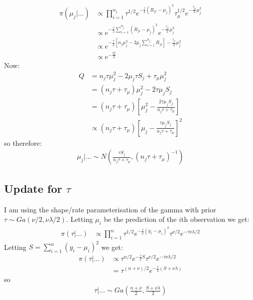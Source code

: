 \documentclass{article}
\begin{document}
\begin{align*}
\pi(\mu_{j}|\ldots)  &\propto \prod_{i=1}^{n_j}  \tau^{1/2} e^{-\frac{\tau}{2} (R_{ji} - \mu_{j})^2} \tau_{\mu}^{1/2} e^{-\frac{\tau_\mu}{2} \mu_{j}^2 }\\
&\propto e^{-\frac{\tau}{2} \sum_{i=1}^{n_j} (R_{ji} - \mu_{j})^2} e^{-\frac{\tau_\mu}{2} \mu_{j}^2 } \\ 
&\propto e^{-\frac{\tau}{2} \left[ n_j \mu_{j}^2 - 2 \mu_j  \sum_{i=1}^{n_j} R_{ji} \right] - \frac{\tau_\mu}{2} \mu_j^2}\\
&\propto e^{-\frac{Q}{2}}
\end{align*}
Now:
\begin{align*}
Q &= n_j \tau \mu_j^2 - 2\mu_j \tau S_j + \tau_\mu \mu_j^2\\
&= (n_j \tau + \tau_\mu) \mu_j^2 - 2 \tau \mu_j S_j \\
&= (n_j \tau + \tau_\mu) \left[ \mu_j^2 - \frac{2 \tau \mu_j S_j}{n_j \tau + \tau_\mu} \right] \\
&\propto (n_j \tau + \tau_\mu) \left[ \mu_j - \frac{\tau \mu_j S_j}{n_j \tau + \tau_\mu} \right]^2
\end{align*}
so therefore:
\begin{align}
\mu_j| \ldots \sim N \left( \frac{\tau S_j}{n_j \tau + \tau_\mu} , (n_j \tau + \tau_\mu)^{-1} \right)
\end{align}

\subsection*{Update for $\tau$}

I am using the shape/rate parameterisation of the gamma with prior $\tau \sim Ga(\nu/2, \nu \lambda / 2)$. Letting $\mu_i$ be the prediction of the $i$th observation we get:
\begin{align*}
\pi(\tau | \ldots) &\propto \prod_{i=1}^n \tau^{1/2} e^{-\frac{\tau}{2} (y_i - \mu_i)^2} \tau^{\nu/2} e^{-\tau \nu \lambda / 2}
\end{align*}
Letting $S = \sum_{i=1}^n (y_i - \mu_i)^2$ we get:
\begin{align*}
\pi(\tau | \ldots) &\propto \tau^{n/2} e^{-\frac{\tau}{2} S} \tau^{\nu/2} e^{-\tau \nu \lambda / 2}\\
&= \tau^{(n + \nu)/2} e^{-\frac{\tau}{2} (S + \nu \lambda)}
\end{align*}
so
\begin{align}
\tau | \ldots \sim Ga \left( \frac{n + \nu}{2}, \frac{S + \nu \lambda}{2} \right)
\end{align}
\end{document}
